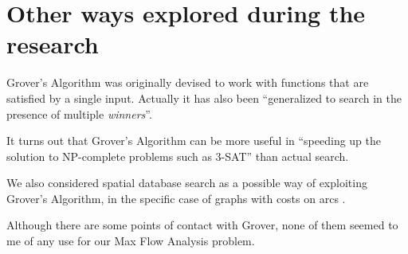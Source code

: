 
\chapter{Other ways explored during the research}
\label{chp:other}

Grover's Algorithm was originally devised to work with functions that are satisfied by a single input. Actually it has also been ``generalized to search in the presence of multiple \textit{winners}''. \cite{Boyer1998}

\bigskip

It turns out that Grover's Algorithm can be more useful in ``speeding up the solution to NP-complete problems such as 3-SAT'' than actual search. \cite{montanaro2016quantum}

\bigskip

We also considered spatial database search as a possible way of exploiting Grover's Algorithm, in the specific case of graphs with costs on arcs \cite{Aharonov:2001:QWG:380752.380758, childs2004spatial}.

Although there are some points of contact with Grover, none of them seemed to me of any use for our Max Flow Analysis problem.

